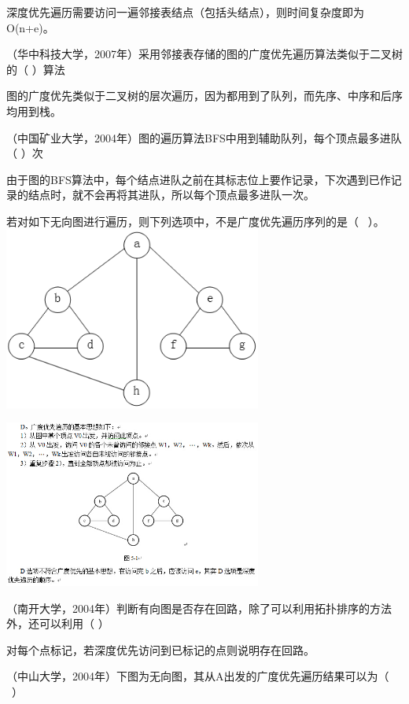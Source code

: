 \begin{solution}深度优先遍历需要访问一遍邻接表结点（包括头结点），则时间复杂度即为O(n+e)。
\end{solution}
\question （华中科技大学，2007年）采用邻接表存储的图的广度优先遍历算法类似于二叉树的（
）算法
\par{}
\begin{solution}图的广度优先类似于二叉树的层次遍历，因为都用到了队列，而先序、中序和后序均用到栈。
\end{solution}
\question （中国矿业大学，2004年）图的遍历算法BFS中用到辅助队列，每个顶点最多进队（
）次
\par{}
\begin{solution}由于图的BFS算法中，每个结点进队之前在其标志位上要作记录，下次遇到已作记录的结点时，就不会再将其进队，所以每个顶点最多进队一次。
\end{solution}
\question 若对如下无向图进行遍历，则下列选项中，不是广度优先遍历序列的是（ ~）。
\includegraphics[width=3.33333in,height=2.36458in]{computerassets/CFE9736FE4AE21334B706E881EEACECC.png}
\par{}
\begin{solution}\includegraphics[width=3.33333in,height=2.16667in]{computerassets/1199b21715cba25d61384b063c453f9a.jpeg}
\end{solution}
\question （南开大学，2004年）判断有向图是否存在回路，除了可以利用拓扑排序的方法外，还可以利用（
）
\par{}
\begin{solution}对每个点标记，若深度优先访问到已标记的点则说明存在回路。
\end{solution}
\question （中山大学，2004年）下图为无向图，其从A出发的广度优先遍历结果可以为（
~）

